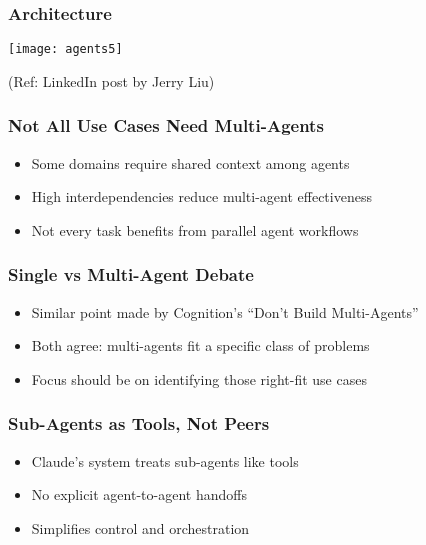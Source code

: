 \begin{frame}[fragile]\frametitle{Architecture}
	
	\begin{center}
	\texttt{[image: agents5]}
	\end{center}
	
{\tiny (Ref: LinkedIn post by Jerry Liu)}

\end{frame}

\begin{frame}[fragile]\frametitle{Not All Use Cases Need Multi-Agents}
    \begin{itemize}
        \item Some domains require shared context among agents
        \item High interdependencies reduce multi-agent effectiveness
        \item Not every task benefits from parallel agent workflows
    \end{itemize}
\end{frame}

\begin{frame}[fragile]\frametitle{Single vs Multi-Agent Debate}
    \begin{itemize}
        \item Similar point made by Cognition's ``Don't Build Multi-Agents''
        \item Both agree: multi-agents fit a specific class of problems
        \item Focus should be on identifying those right-fit use cases
    \end{itemize}
\end{frame}

\begin{frame}[fragile]\frametitle{Sub-Agents as Tools, Not Peers}
    \begin{itemize}
        \item Claude's system treats sub-agents like tools
        \item No explicit agent-to-agent handoffs
        \item Simplifies control and orchestration
    \end{itemize}
\end{frame}

